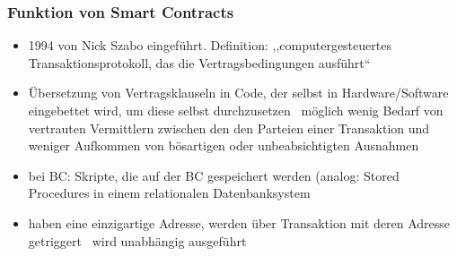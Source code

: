     \subsubsection*{Funktion von Smart Contracts}
        \begin{itemize}
            \item 1994 von Nick Szabo eingeführt. Definition: ,,computergesteuertes Transaktionsprotokoll, das die Vertragsbedingungen ausführt``\cite{Szabo1996}
            \item Übersetzung von Vertragsklauseln in Code, der selbst in Hardware/Software eingebettet wird, um diese selbst durchzusetzen \textrightarrow\ möglich wenig Bedarf von vertrauten Vermittlern zwischen den den Parteien einer Transaktion und weniger Aufkommen von bösartigen oder unbeabsichtigten Ausnahmen
            \item bei BC: Skripte, die auf der BC gespeichert werden (analog: Stored Procedures in einem relationalen Datenbanksystem
            \item haben eine einzigartige Adresse, werden über Transaktion mit deren Adresse getriggert \textrightarrow\ wird unabhängig ausgeführt
        \end{itemize}
        
        